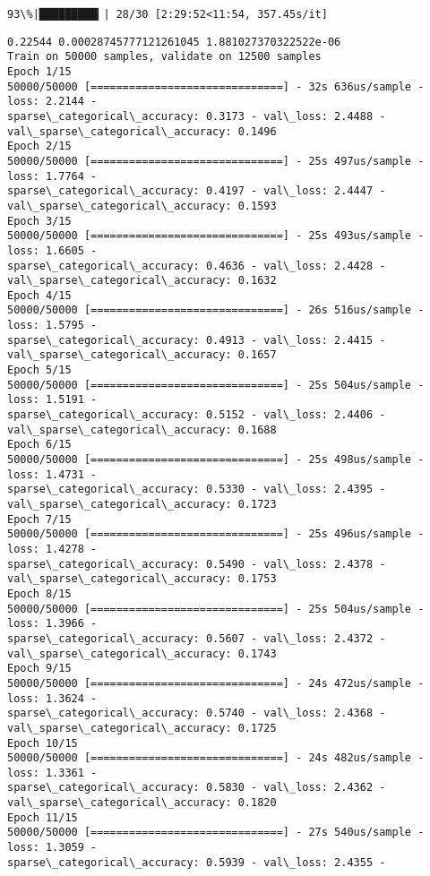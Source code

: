 \documentclass[11pt]{article}
\begin{document}
    \begin{Verbatim}[commandchars=\\\{\}]
 93\%|█████████▎| 28/30 [2:29:52<11:54, 357.45s/it]
    \end{Verbatim}

    \begin{Verbatim}[commandchars=\\\{\}]
0.22544 0.00028745777121261045 1.881027370322522e-06
Train on 50000 samples, validate on 12500 samples
Epoch 1/15
50000/50000 [==============================] - 32s 636us/sample - loss: 2.2144 -
sparse\_categorical\_accuracy: 0.3173 - val\_loss: 2.4488 -
val\_sparse\_categorical\_accuracy: 0.1496
Epoch 2/15
50000/50000 [==============================] - 25s 497us/sample - loss: 1.7764 -
sparse\_categorical\_accuracy: 0.4197 - val\_loss: 2.4447 -
val\_sparse\_categorical\_accuracy: 0.1593
Epoch 3/15
50000/50000 [==============================] - 25s 493us/sample - loss: 1.6605 -
sparse\_categorical\_accuracy: 0.4636 - val\_loss: 2.4428 -
val\_sparse\_categorical\_accuracy: 0.1632
Epoch 4/15
50000/50000 [==============================] - 26s 516us/sample - loss: 1.5795 -
sparse\_categorical\_accuracy: 0.4913 - val\_loss: 2.4415 -
val\_sparse\_categorical\_accuracy: 0.1657
Epoch 5/15
50000/50000 [==============================] - 25s 504us/sample - loss: 1.5191 -
sparse\_categorical\_accuracy: 0.5152 - val\_loss: 2.4406 -
val\_sparse\_categorical\_accuracy: 0.1688
Epoch 6/15
50000/50000 [==============================] - 25s 498us/sample - loss: 1.4731 -
sparse\_categorical\_accuracy: 0.5330 - val\_loss: 2.4395 -
val\_sparse\_categorical\_accuracy: 0.1723
Epoch 7/15
50000/50000 [==============================] - 25s 496us/sample - loss: 1.4278 -
sparse\_categorical\_accuracy: 0.5490 - val\_loss: 2.4378 -
val\_sparse\_categorical\_accuracy: 0.1753
Epoch 8/15
50000/50000 [==============================] - 25s 504us/sample - loss: 1.3966 -
sparse\_categorical\_accuracy: 0.5607 - val\_loss: 2.4372 -
val\_sparse\_categorical\_accuracy: 0.1743
Epoch 9/15
50000/50000 [==============================] - 24s 472us/sample - loss: 1.3624 -
sparse\_categorical\_accuracy: 0.5740 - val\_loss: 2.4368 -
val\_sparse\_categorical\_accuracy: 0.1725
Epoch 10/15
50000/50000 [==============================] - 24s 482us/sample - loss: 1.3361 -
sparse\_categorical\_accuracy: 0.5830 - val\_loss: 2.4362 -
val\_sparse\_categorical\_accuracy: 0.1820
Epoch 11/15
50000/50000 [==============================] - 27s 540us/sample - loss: 1.3059 -
sparse\_categorical\_accuracy: 0.5939 - val\_loss: 2.4355 -

\end{Verbatim}
\end{document}
